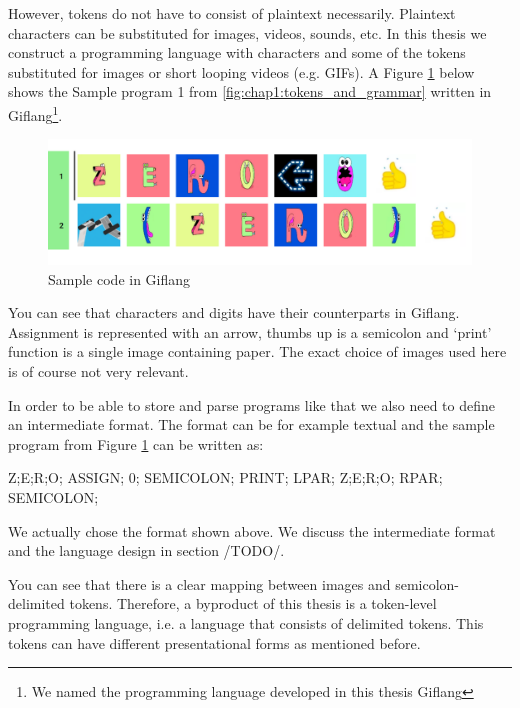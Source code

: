 However, tokens do not have to consist of plaintext necessarily. Plaintext characters can be substituted for
images, videos, sounds, etc. In this thesis we construct a programming language with characters and some
of the tokens substituted for images or short looping videos (e.g. GIFs). A Figure \ref{fig:chap1:giflang_code} below shows
the Sample program 1 from \ref{fig:chap1:tokens_and_grammar} written in Giflang\footnote{We named the programming
language developed in this thesis Giflang}.
\begin{figure}[!hbt]
	\includegraphics[width=\textwidth]{../img/giflang_code}
	\caption{Sample code in Giflang}
	\label{fig:chap1:giflang_code}
\end{figure}

You can see that characters and digits have their counterparts in Giflang. Assignment is represented with an arrow,
thumbs up is a semicolon and `print' function is a single image containing paper. The exact choice of images used here is of course
not very relevant.

In order to be able to store and parse programs like that we also need to define an intermediate
format. The format can be for example textual and the sample program from Figure \ref{fig:chap1:giflang_code} can be written as:
\begin{code}
Z;E;R;O; ASSIGN; 0; SEMICOLON;
PRINT; LPAR; Z;E;R;O; RPAR; SEMICOLON;
\end{code}

We actually chose the format shown above. We discuss the intermediate format and the language design in section /TODO/.

You can see that there is a clear mapping between images and semicolon-delimited tokens. Therefore, a byproduct of
this thesis is a token-level programming language, i.e. a language that consists of delimited tokens. This tokens
can have different presentational forms as mentioned before.

